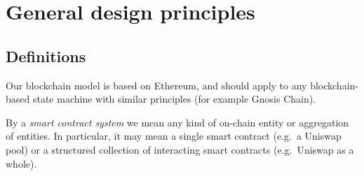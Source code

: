 \documentclass[a4paper,10pt]{article}
\theoremstyle{remark}
\begin{document}
\section{General design principles}
\label{general}

\subsection{Definitions}

Our blockchain model is based on Ethereum, and should apply to any blockchain-based state machine with similar principles (for example Gnosis Chain).
%

By a \emph{smart contract system} we mean any kind of on-chain entity or aggregation of entities. In particular, it may mean a single smart contract (e.g.~a Uniswap pool) or a structured collection of interacting smart contracts (e.g.~Uniswap as a whole).
\end{document}
